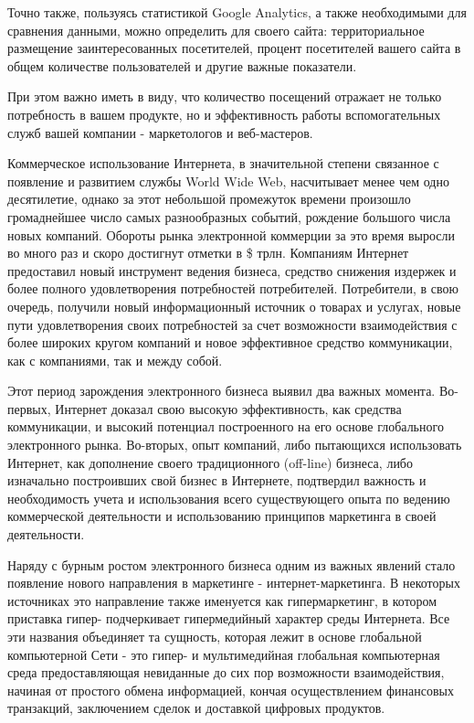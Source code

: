 \documentclass[a4paper,english,russian]{G2-105}
\begin{document}
\par Точно также, пользуясь статистикой Google Analytics, а также необходимыми для сравнения данными, можно определить для своего сайта: территориальное размещение заинтересованных посетителей, процент посетителей вашего сайта в общем количестве пользователей и другие важные показатели.
\par При этом важно иметь в виду, что количество посещений отражает не только потребность в вашем продукте, но и эффективность работы вспомогательных служб вашей компании - маркетологов и веб-мастеров.

\par Коммерческое использование Интернета, в значительной степени связанное с появление и развитием службы World Wide Web, насчитывает менее чем одно десятилетие, однако за этот небольшой промежуток времени произошло громаднейшее число самых разнообразных событий, рождение большого числа новых компаний. Обороты рынка электронной коммерции за это время выросли во много раз и скоро достигнут отметки в \$ трлн. Компаниям Интернет предоставил новый инструмент ведения бизнеса, средство снижения издержек и более полного удовлетворения потребностей потребителей. Потребители, в свою очередь, получили новый информационный источник о товарах и услугах, новые пути удовлетворения своих потребностей за счет возможности взаимодействия с более широких кругом компаний и новое эффективное средство коммуникации, как с компаниями, так и между собой.
\par Этот период зарождения электронного бизнеса выявил два важных момента. Во-первых, Интернет доказал свою высокую эффективность, как средства коммуникации, и высокий потенциал построенного на его основе глобального электронного рынка. Во-вторых, опыт компаний, либо пытающихся использовать Интернет, как дополнение своего традиционного (off-line) бизнеса, либо изначально построивших свой бизнес в Интернете, подтвердил важность и необходимость учета и использования всего существующего опыта по ведению коммерческой деятельности и использованию принципов маркетинга в своей деятельности.
\par Наряду с бурным ростом электронного бизнеса одним из важных явлений стало появление нового направления в маркетинге - интернет-маркетинга. В некоторых источниках это направление также именуется как гипермаркетинг, в котором приставка гипер- подчеркивает гипермедийный характер среды Интернета. Все эти названия объединяет та сущность, которая лежит в основе глобальной компьютерной Сети - это гипер- и мультимедийная глобальная компьютерная среда предоставляющая невиданные до сих пор возможности взаимодействия, начиная от простого обмена информацией, кончая осуществлением финансовых транзакций, заключением сделок и доставкой цифровых продуктов.
\end{document}
